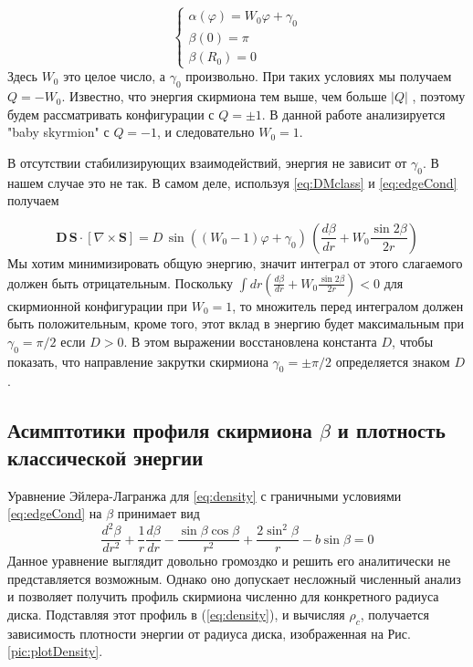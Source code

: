 \documentclass[a4paper,article,14pt]{extarticle}
\begin{document}
\begin{equation}
\label{eq:edgeCond}
{\left\{ {\begin{array}{*{20}{c}}
  {\alpha \left( \varphi  \right) = {W_0}\varphi  + {\gamma _0}} \\ 
  {\beta (0) = \pi } \\ 
  {\beta ({R_0}) = 0} 
\end{array}} \right.}
\end{equation}
Здесь $W_0$ это целое число, а $\gamma _0$ произвольно. При таких условиях мы получаем $Q=-W_0$. Известно, что энергия скирмиона тем выше, чем больше $|Q|$ \cite{rajaraman}, поэтому будем рассматривать конфигурации с $Q=\pm 1$. В данной работе анализируется "baby skyrmion" с $Q=-1$, и следовательно $W_0 = 1$.

В отсутствии стабилизирующих взаимодействий, энергия не зависит от $\gamma_0$. В нашем случае это не так. В самом деле, используя \eqref{eq:DMclass} и \eqref{eq:edgeCond} получаем

\[\mathbf{D} \, {\mathbf{S}} \cdot \left[ {\nabla  \times {\mathbf{S}}} \right] = D \, \sin \left( {\left( {{W_0} - 1} \right) \varphi  + {\gamma _0}} \right)\,\left( {\frac{{d\beta }}{{dr}} + {W_0}\frac{{\sin 2\beta }}{{2r}}} \right)\]
Мы хотим минимизировать общую энергию, значит интеграл от этого слагаемого должен быть отрицательным. Поскольку $\int {d{r}} \left( {\frac{{d\beta }}{{dr}} + {W_0}\frac{{\sin 2\beta }}{{2r}}} \right) < 0$ для скирмионной конфигурации  при $W_0=1$, то множитель перед интегралом должен быть положительным, кроме того, этот вклад в энергию будет максимальным при $\gamma_0 = \pi/2$ если $D>0$. В этом выражении восстановлена константа $D$, чтобы показать, что направление закрутки скирмиона $\gamma_0 = \pm \pi/2$ определяется знаком $D$.


\subsection{Асимптотики профиля скирмиона $\beta$ и плотность классической энергии }

Уравнение Эйлера-Лагранжа для \eqref{eq:density} с граничными условиями \eqref{eq:edgeCond} на $\beta$ принимает вид
\begin{equation}
\label{eq:eulerLagr}
\frac{{{d^2}\beta }}{{d{r^2}}} + \frac{1}{r}\frac{{d\beta }}{{dr}} - \frac{{\sin \beta \cos \beta }}{{{r^2}}} + \frac{{2{{\sin }^2}\beta }}{r} - b\sin \beta  = 0
\end{equation}
Данное уравнение выглядит довольно громоздко и решить его аналитически не представляется возможным. Однако оно допускает несложный численный анализ и позволяет получить профиль скирмиона численно для конкретного радиуса диска. Подставляя этот профиль в (\ref{eq:density}), и вычисляя $\rho_c$, получается зависимость плотности энергии от радиуса диска, изображенная на Рис. \ref{pic:plotDensity}.
\end{document}
